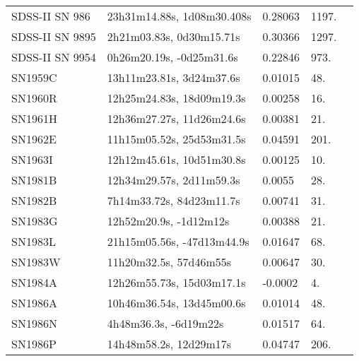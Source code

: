 \begin{longtable}{lllll}
   SDSS-II SN 986 &     23h31m14.88s, 1d08m30.408s &  0.28063 &          1197. &    \citet{2016SDSSD.C...0000:} \\
  SDSS-II SN 9895 &       2h21m03.83s, 0d30m15.71s &  0.30366 &          1297. &    \citet{2016SDSSD.C...0000:} \\
  SDSS-II SN 9954 &       0h26m20.19s, -0d25m31.6s &  0.22846 &           973. &    \citet{2016SDSSD.C...0000:} \\
          SN1959C &       13h11m23.81s, 3d24m37.6s &  0.01015 &            48. &    \citet{1999PASP..111..438F} \\
          SN1960R &      12h25m24.83s, 18d09m19.3s &  0.00258 &            16. &    \citet{1991RC3.9.C...0000d} \\
          SN1961H &      12h36m27.27s, 11d26m24.6s &  0.00381 &            21. &    \citet{2000MNRAS.313..469S} \\
          SN1962E &      11h15m05.52s, 25d53m31.5s &  0.04591 &           201. &    \citet{2007SDSS6.C...0000:} \\
          SN1963I &      12h12m45.61s, 10d51m30.8s &  0.00125 &            10. &    \citet{2008AJ....136..713K} \\
          SN1981B &       12h34m29.57s, 2d11m59.3s &   0.0055 &            28. &    \citet{20032dF...C...0000C} \\
          SN1982B &       7h14m33.72s, 84d23m11.7s &  0.00741 &            31. &    \citet{1991RC3.9.C...0000d} \\
          SN1983G &         12h52m20.9s, -1d12m12s &  0.00388 &            21. &    \citet{2011MNRAS.413..813C} \\
          SN1983L &     21h15m05.56s, -47d13m44.9s &  0.01647 &            68. &    \citet{1991RC3.9.C...0000d} \\
          SN1983W &         11h20m32.5s, 57d46m55s &  0.00647 &            30. &  \citet{1998AandAS..130..333T} \\
          SN1984A &      12h26m55.73s, 15d03m17.1s &  -0.0002 &             4. &    \citet{2016SDSSD.C...0000:} \\
          SN1986A &      10h46m36.54s, 13d45m00.6s &  0.01014 &            48. &    \citet{2006HIPAS.C...0000:} \\
          SN1986N &          4h48m36.3s, -6d19m22s &  0.01517 &            64. &    \citet{1991RC3.9.C...0000d} \\
          SN1986P &         14h48m58.2s, 12d29m17s &  0.04747 &           206. &    \citet{2011ApJ...735..125S} \\

\end{longtable}
